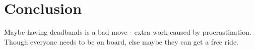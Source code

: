 \section{Conclusion}
Maybe having deadbands is a bad move - extra work caused by procrastination.
Though everyone needs to be on board, else maybe they can get a free ride.